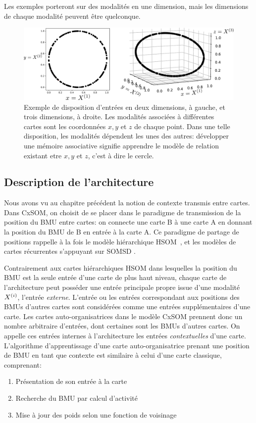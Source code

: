 \documentclass[../main]{subfiles}
\begin{document}
Les exemples porteront sur des modalités en une dimension, mais les dimensions de chaque modalité peuvent être quelconque.
\begin{figure}
\centering
\includegraphics[width=\textwidth]{inputs_3som}
\caption{Exemple de disposition d'entrées en deux dimensions, à gauche, et trois dimensions, à droite. Les modalités associées à différentes cartes sont les coordonnées $x,y$ et $z$ de chaque point. Dans une telle disposition, les modalités dépendent les unes des autres: développer une mémoire associative signifie apprendre le modèle de relation existant etre $x,y$ et $z$, c'est à dire le cercle.\label{fig:input_3som}}
\end{figure}

\subsection{Description de l'architecture}

Nous avons vu au chapitre précédent la notion de contexte transmis entre cartes. Dans CxSOM, on choisit de se placer dans le paradigme de transmission de la position du BMU entre cartes: on connecte une carte B à une carte A en donnant la position du BMU de B en entrée à la carte A. 
Ce paradigme de partage de positions rappelle à la fois le modèle hiérarchique HSOM~\cite{lampinen_clustering_1992}, et les modèles de cartes récurrentes s'appuyant sur SOMSD \cite{hammer_recursive_2004,hagenbuchner_self-organizing_2003,fix20}.


Contrairement aux cartes hiérarchiques HSOM dans lesquelles la position du BMU est la seule entrée d'une carte de plus haut niveau, chaque carte de l'architecture peut posséder une entrée principale propre issue d'une modalité $X^{({i})}$, l'entrée \emph{externe}. L'entrée ou les entrées correspondant aux positions des BMUs d'autres cartes sont considérées comme une entrées supplémentaires d'une carte. Les cartes auto-organisatrices dans le modèle CxSOM prennent donc un nombre arbitraire d'entrées, dont certaines sont les BMUs d'autres cartes. On appelle ces entrées internes à l'architecture les entrées \emph{contextuelles} d'une carte.
L'algorithme d'apprentissage d'une carte auto-organisatrice prenant une position de BMU en tant que contexte est similaire à celui d'une carte classique, comprenant:
\begin{enumerate}
\item\label{etape:entree} Présentation de son entrée à la carte 
\item\label{etape:bmu} Recherche du BMU par calcul d'activité
\item\label{etape:maj} Mise à jour des poids selon une fonction de voisinage
\end{enumerate}
\end{document}
